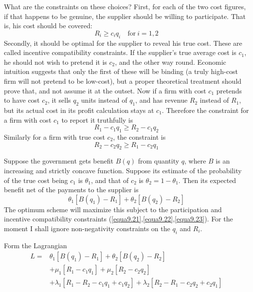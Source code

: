 What are the constraints on these choices? First, for each of the two cost figures, if that happens to be genuine, the supplier should be willing to participate. That is, his cost should be covered:
\begin{equation} \label{equa9.21}
R_i \geq c_i q_i \quad \mbox{for} \ i=1,2
\end{equation}
Secondly, it should be optimal for the supplier to reveal his true cost. These are called incentive compatibility constraints. If the supplier's true average cost is $c_1$, he should not wish to pretend it is $c_2$, and the other way round. Economic intuition suggests that only the first of these will be binding (a truly high-cost firm will not pretend to be low-cost), but a proper theoretical treatment should prove that, and not assume it at the outset. Now if a firm with cost $c_1$ pretends to have cost $c_2$, it sells $q_2$ units instead of $q_1$, and has revenue $R_2$ instead of $R_1$, but its actual cost in its profit calculation stays at $c_1$. Therefore the constraint for a firm with cost $c_1$ to report it truthfully is 
\begin{equation}\label{equa9.22}
R_1 - c_1 q_1 \geq R_2 - c_1 q_2
\end{equation}
Similarly for a firm with true cost $c_2$, the constraint is 
\begin{equation} \label{equa9.23}
R_2 - c_2 q_2 \geq R_1 - c_2 q_1
\end{equation}

Suppose the government gets benefit $B(q)$ from quantity $q$, where $B$ is an increasing and strictly concave function. Suppose its estimate of the probability of the true cost being $c_1$ is $\theta_1$, and that of $c_2$ is $\theta_2 = 1- \theta_1$. Then its expected benefit net of the payments to the supplier is 
\begin{equation} \label{equa9.24}
\theta_1 [B(q_1) - R_1] + \theta_2 [B(q_2) - R_2]
\end{equation}
The optimum scheme will maximize this subject to the participation and incentive compatibility constraints (\ref{equa9.21},\ref{equa9.22},\ref{equa9.23}). For the moment I shall ignore non-negativity constraints on the $q_i$ and $R_i$.

Form the Lagrangian
\begin{equation*}
\begin{array}{rl}
L =& \theta_1[B(q_1) - R_1] + \theta_2 [B(q_2) - R_2] \\
   & + \mu_1 [R_1 -c_1 q_1] + \mu_2 [R_2 - c_2 q_2] \\
   & + \lambda_1 [R_1 - R_2 - c_1 q_1 + c_1 q_2] +  \lambda_2 [R_2 - R_1 - c_2 q_2 + c_2 q_1]
\end{array}
\end{equation*}

